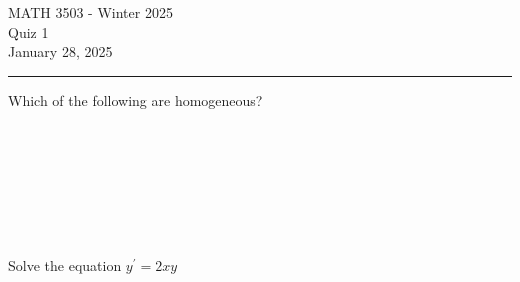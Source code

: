 \documentclass[12pt,letterpaper, onecolumn]{exam}
\begin{document}
\begingroup  
    \centering
    \LARGE MATH 3503 - Winter 2025\\
    \LARGE Quiz 1\\[0.5em]
    \large January 28, 2025\\[0.5em]
\endgroup
\rule{\textwidth}{0.4pt}
\pointsdroppedatright   %
\printanswers
\renewcommand{\solutiontitle}{\noindent\textbf{Ans:}\enspace}   %

\begin{questions}

    \question[3 Marks] Which of the following are homogeneous?\droppoints
    
    \begin{solution}
            \\
            \\
            \\
            \\
            \\
            \\
    \end{solution}
    
    \question[3 Marks] Solve the equation $y^{'} = 2xy$ \droppoints
    
    \begin{solution}
    \\
    \\
    \\
    \\
    \\
    \\
    \\
    \\
    \\
    \\
    \\
    \\
    \\
    \\
    \\
    \end{solution}


\end{questions}
\end{document}
